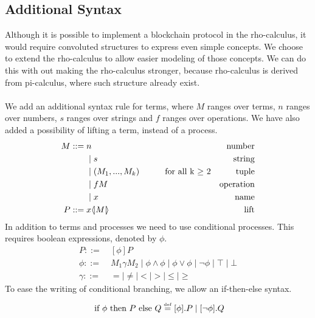 \subsection{Additional Syntax} \label{sec:addsyntax}
Although it is possible to implement a blockchain protocol in the rho-calculus, it would require convoluted structures to express even simple concepts.
We choose to extend the rho-calculus to allow easier modeling of those concepts.
We can do this with out making the rho-calculus stronger, because rho-calculus is derived from pi-calculus, where such structure already exist. \citep{Meredith2005}\\
\\
We add an additional syntax rule for terms, where $M$ ranges over terms, $n$ ranges over numbers, $s$ ranges over strings and $f$ ranges over operations. We have also added a possibility of lifting a term, instead of a process.
\begin{align*}
M::=\; & n &\text{number}\\
 &\mid s &\text{string}\\
 &\mid (M_1,...,M_k)\quad\quad\quad \text{for all k $\geq$ 2} &\text{tuple}\\
 &\mid fM &\text{operation}\\
 &\mid x &\text{name}\\ 
P::=\;& x \langle \! | M | \! \rangle&\text{lift}
 \end{align*}
In addition to terms and processes we need to use conditional processes. This requires boolean expressions, denoted by \ensuremath{\phi}.
\begin{align*}
P::=& \ [\phi] P\\
\phi ::=& \ M_1\gamma M_2 \mid \phi\land\phi \mid \phi\lor\phi \mid \neg\phi \mid \top \mid \bot\\
\gamma ::=& \ = \mid \neq \mid < \mid > \mid \leq \mid \geq
\end{align*}
To ease the writing of conditional branching, we allow an if-then-else syntax.
\begin{align*}
	\text{ if }\phi\text{ then }P\text{ else }Q \overset{\underset{\mathrm{def}}{}}{=} [\phi].P \mid [\neg \phi].Q
\end{align*}


